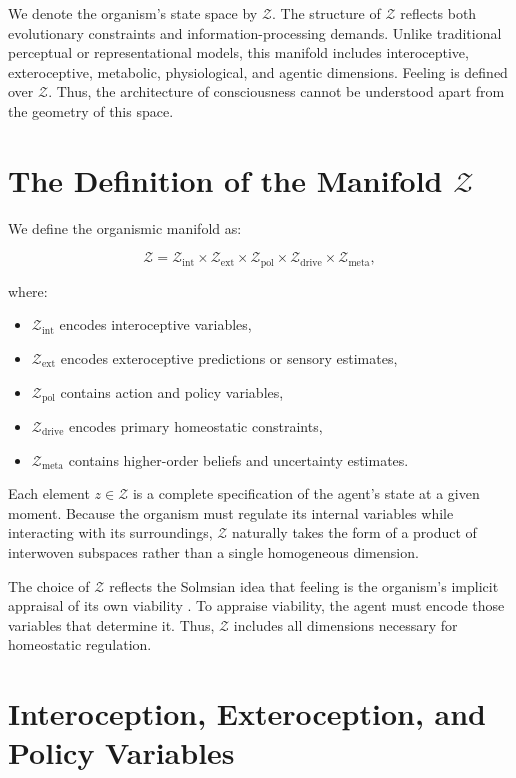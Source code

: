 \documentclass[12pt,oneside]{book}
\theoremstyle{plain}
\theoremstyle{definition}
\let\citep\parencite
\begin{document}
We denote the organism’s state space by $\mathcal{Z}$.
The structure of $\mathcal{Z}$ reflects both evolutionary constraints and
information-processing demands.
Unlike traditional perceptual or representational models, this manifold includes
interoceptive, exteroceptive, metabolic, physiological, and agentic dimensions.
Feeling is defined over $\mathcal{Z}$.
Thus, the architecture of consciousness cannot be understood apart from the
geometry of this space.

\section{The Definition of the Manifold \texorpdfstring{$\mathcal{Z}$}{Z}}

We define the organismic manifold as:

\[
\mathcal{Z} =
\mathcal{Z}_{\mathrm{int}}
\times
\mathcal{Z}_{\mathrm{ext}}
\times
\mathcal{Z}_{\mathrm{pol}}
\times
\mathcal{Z}_{\mathrm{drive}}
\times
\mathcal{Z}_{\mathrm{meta}},
\]

where:
\begin{itemize}
    \item $\mathcal{Z}_{\mathrm{int}}$ encodes interoceptive variables,
    \item $\mathcal{Z}_{\mathrm{ext}}$ encodes exteroceptive predictions or sensory estimates,
    \item $\mathcal{Z}_{\mathrm{pol}}$ contains action and policy variables,
    \item $\mathcal{Z}_{\mathrm{drive}}$ encodes primary homeostatic constraints,
    \item $\mathcal{Z}_{\mathrm{meta}}$ contains higher-order beliefs and uncertainty estimates.
\end{itemize}

Each element $z \in \mathcal{Z}$ is a complete specification of the agent’s
state at a given moment.
Because the organism must regulate its internal variables while interacting with
its surroundings, $\mathcal{Z}$ naturally takes the form of a product of
interwoven subspaces rather than a single homogeneous dimension.

The choice of $\mathcal{Z}$ reflects the Solmsian idea that feeling is the
organism’s implicit appraisal of its own viability
\citep{solms2021hidden}.
To appraise viability, the agent must encode those variables that determine it.
Thus, $\mathcal{Z}$ includes all dimensions necessary for homeostatic regulation.

\section{Interoception, Exteroception, and Policy Variables}
\end{document}
